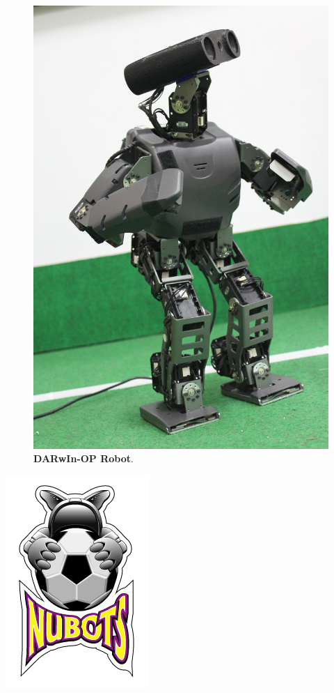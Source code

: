 \documentclass[10pt,a4paper]{article}
\begin{document}
\begin{multicols}{2}
\begin{figure}[H]
	\begin{center}
		\includegraphics[scale=0.25]{darwin_new_small.jpg}\\
		\textbf{DARwIn-OP Robot}.
	\end{center}
\end{figure}

\end{multicols}

\begin{center}
	\includegraphics[scale=0.8]{nubots_logo.png}
\end{center}
\end{document}
